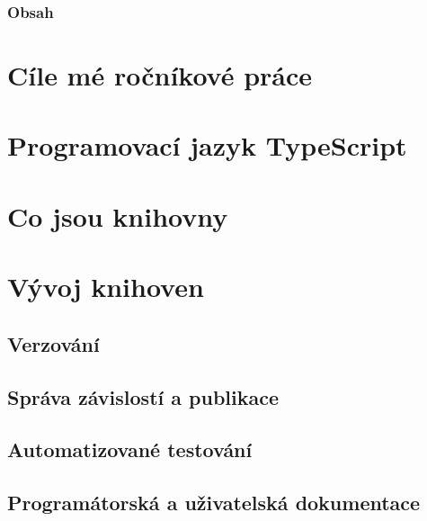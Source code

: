 




\begin{frame}
    \frametitle{Obsah}
    \tableofcontents
\end{frame}

\section[Ročníková práce]{Cíle mé ročníkové práce}	

	

\section[TypeScript]{Programovací jazyk TypeScript}





\section[Knihovny]{Co jsou knihovny}



\section[Vývoj knihoven]{Vývoj knihoven}

	

\subsection{Verzování}



\subsection[Správce balíčků]{Správa závislostí a publikace}



\subsection[Testování]{Automatizované testování}

	

\subsection[Dokumentace]{Programátorská a uživatelská dokumentace}

	




